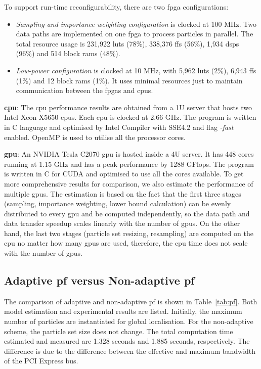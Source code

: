 To support run-time reconfigurability, there are two \gls{fpga} configurations:
\begin{itemize}
\item {\it Sampling and importance weighting configuration} is clocked at 100 MHz.
Two data paths are implemented on one \gls{fpga} to process particles in parallel.
The total resource usage is 231,922 \glspl{lut} (78\%), 338,376 \glspl{ff} (56\%), 1,934 \glspl{dsp} (96\%) and 514 block \glspl{ram} (48\%).
\item {\it Low-power configuration} is clocked at 10 MHz, with 5,962 \glspl{lut} (2\%), 6,943 \glspl{ff} (1\%) and 12 block \glspl{ram} (1\%).
It uses minimal resources just to maintain communication between the \gls{fpga}s and \gls{cpu}s.
\end{itemize}

\textbf{\gls{cpu}}: The \gls{cpu} performance results are obtained from a 1U server that hosts two Intel Xeon X5650 \gls{cpu}s. 
Each \gls{cpu} is clocked at 2.66 GHz.
The program is written in C language and optimised by Intel Compiler with SSE4.2 and flag {\it -fast} enabled.
OpenMP is used to utilise all the processor cores.

\textbf{\gls{gpu}}: An NVIDIA Tesla C2070 \gls{gpu} is hosted inside a 4U server.
It has 448 cores running at 1.15 GHz and has a peak performance by 1288 GFlops.
The program is written in C for CUDA and optimised to use all the cores available.
To get more comprehensive results for comparison, we also estimate the performance of multiple \gls{gpu}s.
The estimation is based on the fact that the first three stages (sampling, importance weighting, lower bound calculation) can be evenly distributed to every \gls{gpu} and be computed independently, 
so the data path and data transfer speedup scales linearly with the number of \gls{gpu}s.
On the other hand, the last two stages (particle set resizing, resampling) are computed on the \gls{cpu} no matter how many \gls{gpu}s are used, therefore, the \gls{cpu} time does not scale with the number of \gls{gpu}s.

\subsection{Adaptive \gls{pf} versus Non-adaptive \gls{pf}}
The comparison of adaptive and non-adaptive \gls{pf} is shown in Table~\ref{tab:pf}.
Both model estimation and experimental results are listed.
Initially, the maximum number of particles are instantiated for global localisation.
For the non-adaptive scheme, the particle set size does not change.
The total computation time estimated and measured are 1.328 seconds and 1.885 seconds, respectively.
The difference is due to the difference between the effective and maximum bandwidth of the PCI Express bus.

